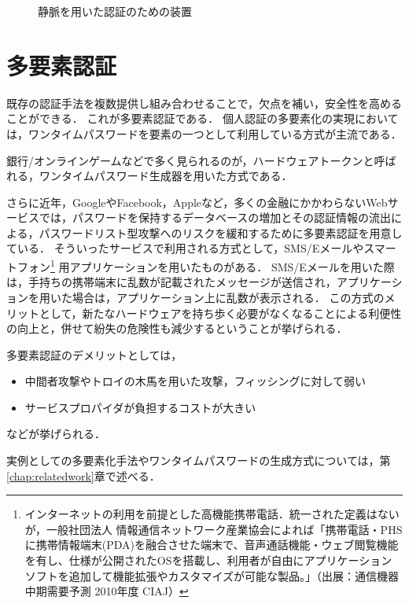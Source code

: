 \begin{figure}[th]
\begin{center}
\end{center}
\caption{静脈を用いた認証のための装置}
\label{fig:veinAuth}
\end{figure}

\section{多要素認証}\label{sec:2factor}
既存の認証手法を複数提供し組み合わせることで，欠点を補い，安全性を高めることができる．
これが多要素認証である．
個人認証の多要素化の実現においては，ワンタイムパスワードを要素の一つとして利用している方式が主流である．\cite{arXiv:1309.5344}

銀行/オンラインゲームなどで多く見られるのが，ハードウェアトークンと呼ばれる，ワンタイムパスワード生成器を用いた方式である．

さらに近年，GoogleやFacebook，Appleなど，多くの金融にかかわらないWebサービスでは，パスワードを保持するデータベースの増加とその認証情報の流出による，パスワードリスト型攻撃へのリスクを緩和するために多要素認証を用意している．
そういったサービスで利用される方式として，SMS/Eメールやスマートフォン\footnote{インターネットの利用を前提とした高機能携帯電話．統一された定義はないが，一般社団法人 情報通信ネットワーク産業協会によれば「携帯電話・PHSに携帯情報端末(PDA)を融合させた端末で、音声通話機能・ウェブ閲覧機能を有し、仕様が公開されたOSを搭載し、利用者が自由にアプリケーションソフトを追加して機能拡張やカスタマイズが可能な製品。」（出展：通信機器中期需要予測 2010年度 CIAJ）} 用アプリケーションを用いたものがある．
SMS/Eメールを用いた際は，手持ちの携帯端末に乱数が記載されたメッセージが送信され，アプリケーションを用いた場合は，アプリケーション上に乱数が表示される．
この方式のメリットとして，新たなハードウェアを持ち歩く必要がなくなることによる利便性の向上と，併せて紛失の危険性も減少するということが挙げられる．

多要素認証のデメリットとしては，
\begin{itemize}
\item 中間者攻撃やトロイの木馬を用いた攻撃，フィッシングに対して弱い
\item サービスプロパイダが負担するコストが大きい
\end{itemize}
などが挙げられる．

実例としての多要素化手法やワンタイムパスワードの生成方式については，第\ref{chap:relatedwork}章で述べる．

